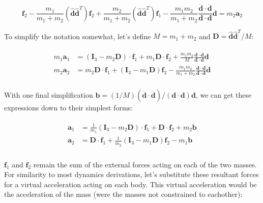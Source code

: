 \documentclass[]{article}
\begin{document}
	\begin{equation*}
		\mathbf{f}_2 - \frac{m_1}{m_1 + m_2} \left( \hat{\mathbf{d}} \hat{\mathbf{d}}^T \right) \mathbf{f}_2 + \frac{m_2}{m_1 + m_2} \left( \hat{\mathbf{d}} \hat{\mathbf{d}}^T \right) \mathbf{f}_1 - \frac{m_1 m_2}{m_1 + m_2} \frac{\dot{\mathbf{d}} \cdot \dot{\mathbf{d}}}{\mathbf{d} \cdot \mathbf{d}} \mathbf{d} = m_2 \mathbf{a}_2
	\end{equation*}

	To simplify the notation somewhat, let's define $M = m_1 + m_2$ and $\mathbf{D} = \hat{\mathbf{d}} \hat{\mathbf{d}}^T / M$:

	\begin{align}
	\begin{split}
		m_1 \mathbf{a}_1 &= (\mathbf{I}_3 - m_2 \mathbf{D}) \cdot \mathbf{f}_1 + m_1 \mathbf{D} \cdot \mathbf{f}_2 + \frac{m_1 m_2}{M} \frac{\dot{\mathbf{d}} \cdot \dot{\mathbf{d}}}{\mathbf{d} \cdot \mathbf{d}} \mathbf{d} \\
		m_2 \mathbf{a}_2 &= m_2 \mathbf{D} \cdot \mathbf{f}_1 + (\mathbf{I}_3 - m_1 \mathbf{D}) \mathbf{f}_2 - \frac{m_1 m_2}{m_1 + m_2} \frac{\dot{\mathbf{d}} \cdot \dot{\mathbf{d}}}{\mathbf{d} \cdot \mathbf{d}} \mathbf{d} \\
	\end{split}
	\end{align}

	With one final simplification $\mathbf{b} = (1/M) (\dot{\mathbf{d}} \cdot \dot{\mathbf{d}}) / (\mathbf{d} \cdot \mathbf{d}) \mathbf{d}$, we can get these expressions down to their simplest forms:

	\begin{align}
	\begin{split}
		\mathbf{a}_1 &= \frac{1}{m_1} (\mathbf{I}_3 - m_2 \mathbf{D}) \cdot \mathbf{f}_1 + \mathbf{D} \cdot \mathbf{f}_2 + m_2 \mathbf{b} \\
		\mathbf{a}_2 &= \mathbf{D} \cdot \mathbf{f}_1 + \frac{1}{m_2} (\mathbf{I}_3 - m_1 \mathbf{D}) \mathbf{f}_2 - m_1 \mathbf{b} \\
	\end{split}
	\end{align}

	$\mathbf{f}_1$ and $\mathbf{f}_2$ remain the sum of the external forces acting on each of the two masses.  For similarity to most dynamics derivations, let's substitute these resultant forces for a virtual acceleration acting on each body.  This virtual acceleration would be the acceleration of the mass (were the masses not constrained to eachother):
\end{document}
